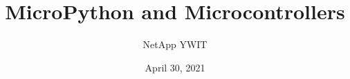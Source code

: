 \documentclass{report}
\begin{document}
\title{MicroPython and Microcontrollers}
\author{NetApp YWIT}
\date{April 30, 2021}
\maketitle

\tableofcontents











\appendix


\end{document}
